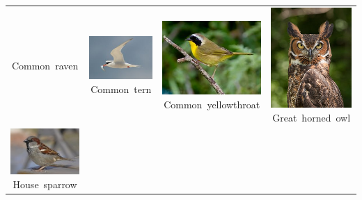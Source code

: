 \documentclass{beamer}
\begin{document}
\begin{frame}
{\begin{tabular}{cccc}
{            \hbox{\tiny Common raven}}
        & 
        \vbox{%
            \hbox{\includegraphics[width=\picwidth]{images/comter.jpg}}
            \hbox{\tiny Common tern}}
        & 
        \vbox{%
            \hbox{\includegraphics[width=\picwidth]{images/comyel.jpg}}
            \hbox{\tiny Common yellowthroat}}
        & 
        \vbox{%
            \hbox{\includegraphics[width=\picwidth]{images/grhowl.jpg}}
            \hbox{\tiny Great horned owl}}
            \\
        \vbox{%
            \hbox{\includegraphics[width=\picwidth]{images/houspa.jpg}}
            \hbox{\tiny House sparrow}}

\end{tabular}}
\end{frame}
\end{document}
